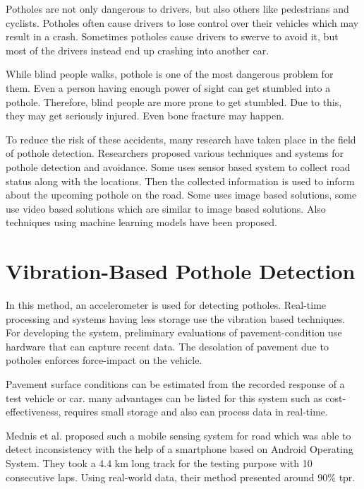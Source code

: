    Potholes are not only dangerous to drivers, but also others like pedestrians and cyclists. Potholes often cause drivers to lose control over their vehicles which may result in a crash. Sometimes potholes cause drivers to swerve to avoid it, but most of the drivers instead end up crashing into another car\cite{romanjul19}.
    
    While blind people walks, pothole is one of the most dangerous problem for them. Even a person having enough power of sight can get stumbled into a pothole. Therefore, blind people are more prone to get stumbled. Due to this, they may get seriously injured. Even bone fracture may happen.
    
    To reduce the risk of these accidents, many research have taken place in the field of pothole detection. Researchers proposed various techniques and systems for pothole detection and avoidance. Some uses sensor based system to collect road status along with the locations. Then the collected information is used to inform about the upcoming pothole on the road. Some uses image based solutions, some use video based solutions which are similar to image based solutions. Also techniques using machine learning models have been proposed.
    
\clearpage
\section{Vibration-Based Pothole Detection}
    In this method, an accelerometer is used for detecting potholes. Real-time processing and systems having less storage use the vibration based techniques. For developing the system, preliminary evaluations of pavement-condition\cite{yu06} use hardware that can capture recent data. The desolation of pavement due to potholes enforces force-impact on the vehicle.
    
    Pavement surface conditions can be estimated from the recorded response of a test vehicle or car\cite{kim14}. many advantages can be listed for this system such as cost-effectiveness, requires small storage and also can process data in real-time\cite{kim14}.
    
    Mednis et al. proposed such a mobile sensing system for road\cite{rao16} which was able to detect inconsistency with the help of a smartphone based on Android Operating System\cite{mednis11,rao16}. They took a 4.4 km long track for the testing purpose with 10 consecutive laps. Using real-world data, their method presented around 90\% \acrfull{tpr}\cite{kim14}.
    
